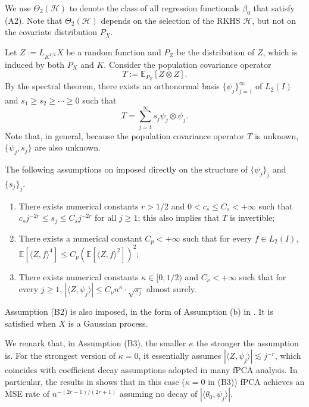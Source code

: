 \documentclass[11pt,a4paper]{article}
\theoremstyle{definition}
\theoremstyle{plain}
\theoremstyle{remark}
\newcommand{\mH}{\mathcal H}
\begin{document}
We use $\Theta_2(\mH)$ to denote the class of all regression functionals $\beta_0$ that satisfy (A2). Note that $\Theta_2(\mH)$ depends on the selection of the RKHS $\mH$, but not on the covariate distribution $P_X$.

Let $Z:=L_{K^{1/2}}X$ be a random function and $P_Z$ be the distribution of $Z$, which is induced by both $P_X$ and $K$. Consider the population covariance operator
$$
T := \mathbb E_{P_Z}\left[Z\otimes Z\right].
$$
By the spectral theorem, there exists an orthonormal basis $\{\psi_j\}_{j=1}^{\infty}$ of $L_2(I)$ and $s_1\geq s_2\geq\cdots\geq 0$ such that
\begin{equation}
T = \sum_{j=1}^{\infty} s_j\psi_j\otimes\psi_j.
\label{eq:specT}
\end{equation}
Note that, in general, because the population covariance operator $T$ is unknown, $\{\psi_j,s_j\}$ are also unknown.

The following assumptions on imposed directly on the structure of $\{\psi_j\}_j$ and $\{s_j\}_j$.
\begin{enumerate}
\item[(B1)] There exists numerical constants $r>1/2$ and $0<c_s\leq C_s<+\infty$ such that $c_s j^{-2r}\leq s_j\leq C_sj^{-2r}$ for all $j\geq 1$;
this also implies that $T$ is invertible;
\item[(B2)] There exists a numerical constant $C_p<+\infty$ such that for every $f\in L_2(I)$, $\mathbb E[\langle Z,f\rangle^4] \leq C_p(\mathbb E[\langle Z,f\rangle^2])^2$;
\item[(B3)] There exists numerical constants $\kappa\in[0,1/2)$ and $C_\nu<+\infty$ such that for every $j\geq 1$, $|\langle Z,\psi_j\rangle| \leq C_\nu n^{\kappa}\cdot \sqrt{s_j}$ almost surely.
\end{enumerate}

Assumption (B2) is also imposed, in the form of Assumption (b) in \citep{yuan2010reproducing}. It is satisfied when $X$ is a Gaussian process.

We remark that, in Assumption (B3), the smaller $\kappa$ the stronger the assumption is. For the strongest version of $\kappa=0$, it essentially assumes $|\langle Z,\psi_j\rangle|\lesssim j^{-r}$,
which coincides with coefficient decay assumptions adopted in many fPCA analysis.
{\color{red}In particular, the results in \cite{cai2006prediction} shows that in this case ($\kappa=0$ in (B3)) fPCA achieves an MSE rate of $n^{-(2r-1)/(2r+1)}$ assuming no decay of $|\langle\theta_0,\psi_j\rangle|$.}
\end{document}
